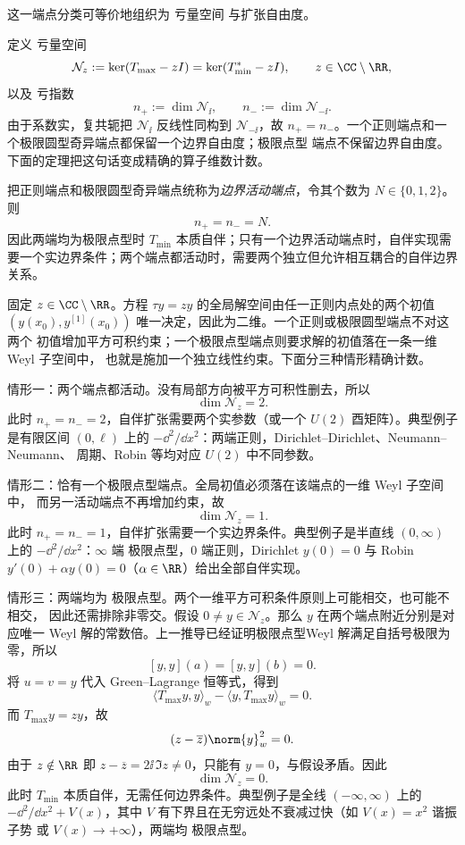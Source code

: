 这一端点分类可等价地组织为 亏量空间 与扩张自由度。

定义 亏量空间
\[
 \mathcal N_z:=\ker(T_{\max}-zI)=\ker(T_{\min}^*-zI),
 \qquad z\in\CC\setminus\RR,
\]
以及 亏指数
\[
 n_+:=\dim\mathcal N_{\ii},
 \qquad
 n_-:=\dim\mathcal N_{-\ii}.
\]
由于系数实，复共轭把 $\mathcal N_{\ii}$ 反线性同构到 $\mathcal N_{-\ii}$，故 $n_+=n_-$。一个正则端点和一个极限圆型奇异端点都保留一个边界自由度；极限点型 端点不保留边界自由度。下面的定理把这句话变成精确的算子维数计数。

\begin{theorem}\label{thm:math-sl-weyl-extension-count}
把正则端点和极限圆型奇异端点统称为\emph{边界活动端点}，令其个数为 $N\in\{0,1,2\}$。则
\[
 n_+=n_-=N.
\]
因此两端均为极限点型时 $T_{\min}$ 本质自伴；只有一个边界活动端点时，自伴实现需要一个实边界条件；两个端点都活动时，需要两个独立但允许相互耦合的自伴边界关系。
\end{theorem}

固定 $z\in\CC\setminus\RR$。方程 $\tau y=zy$ 的全局解空间由任一正则内点处的两个初值
$(y(x_0),y^{[1]}(x_0))$ 唯一决定，因此为二维。一个正则或极限圆型端点不对这两个
初值增加平方可积约束；一个极限点型端点则要求解的初值落在一条一维 Weyl 子空间中，
也就是施加一个独立线性约束。下面分三种情形精确计数。

情形一：两个端点都活动。没有局部方向被平方可积性删去，所以
\[
 \dim\mathcal N_z=2.
\]
此时 $n_+=n_-=2$，自伴扩张需要两个实参数（或一个 $U(2)$ 酉矩阵）。典型例子是有限区间
$(0,\ell)$ 上的 $-\dd^2/\dd x^2$：两端正则，Dirichlet--Dirichlet、Neumann--Neumann、
周期、Robin 等均对应 $U(2)$ 中不同参数。

情形二：恰有一个极限点型端点。全局初值必须落在该端点的一维 Weyl 子空间中，
而另一活动端点不再增加约束，故
\[
 \dim\mathcal N_z=1.
\]
此时 $n_+=n_-=1$，自伴扩张需要一个实边界条件。典型例子是半直线 $(0,\infty)$ 上的
$-\dd^2/\dd x^2$：$\infty$ 端 极限点型，$0$ 端正则，Dirichlet $y(0)=0$ 与
Robin $y'(0)+\alpha y(0)=0$（$\alpha\in\RR$）给出全部自伴实现。

情形三：两端均为 极限点型。两个一维平方可积条件原则上可能相交，也可能不相交，
因此还需排除非零交。假设 $0\ne y\in\mathcal N_z$。那么 $y$ 在两个端点附近分别是对应唯一
Weyl 解的常数倍。上一推导已经证明极限点型Weyl 解满足自括号极限为零，所以
\[
 [y,y](a)=[y,y](b)=0.
\]
将 $u=v=y$ 代入 Green--Lagrange 恒等式，得到
\[
 \langle T_{\max}y,y\rangle_w
 -\langle y,T_{\max}y\rangle_w=0.
\]
而 $T_{\max}y=zy$，故
\[
 (z-\overline z)\norm{y}_w^2=0.
\]
由于 $z\notin\RR$ 即 $z-\overline z=2\ii\,\Im z\ne0$，只能有 $y=0$，与假设矛盾。因此
\[
 \dim\mathcal N_z=0.
\]
此时 $T_{\min}$ 本质自伴，无需任何边界条件。典型例子是全线 $(-\infty,\infty)$ 上的
$-\dd^2/\dd x^2+V(x)$，其中 $V$ 有下界且在无穷远处不衰减过快（如 $V(x)=x^2$ 谐振子势
或 $V(x)\to+\infty$），两端均 极限点型。

